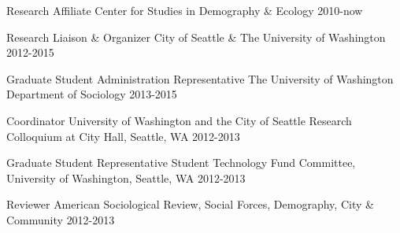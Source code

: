 



\begin{cvhonors}


  \cvhonor
    {Research Affiliate} %
    {Center for Studies in Demography \& Ecology} %
    {} %
    {2010-now} %

  \cvhonor
    {Research Liaison \& Organizer} %
    {City of Seattle \& The University of Washington} %
    {} %
    {2012-2015} %

  \cvhonor
    {Graduate Student Administration Representative} %
    {The University of Washington Department of Sociology} %
    {} %
    {2013-2015} %

  \cvhonor
    {Coordinator} %
    {University of Washington and the City of Seattle Research Colloquium at City Hall, Seattle, WA} %
    {} %
    {2012-2013} %

  \cvhonor
    {Graduate Student Representative} %
    {Student Technology Fund Committee, University of Washington, Seattle, WA} %
    {} %
    {2012-2013} %

  \cvhonor
    {Reviewer} %
    {American Sociological Review, Social Forces, Demography, City \& Community} %
    {} %
    {2012-2013} %
    
\end{cvhonors}

